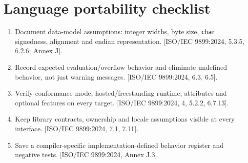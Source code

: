 \documentclass[10pt,letterpaper,oneside]{report}
\newcommand{\refcl}[1]{\textsf{\footnotesize[ISO/IEC 9899:2024, #1]}}
\begin{document}
\chapter{Language portability checklist}
\begin{enumerate}
\item Document data-model assumptions: integer widths, byte size, \texttt{char} signedness, alignment and endian representation. \refcl{5.3.5, 6.2.6; Annex J}.
\item Record expected evaluation/overflow behavior and eliminate undefined behavior, not just warning messages. \refcl{6.3, 6.5}.
\item Verify conformance mode, hosted/freestanding runtime, attributes and optional features on every target. \refcl{4, 5.2.2, 6.7.13}.
\item Keep library contracts, ownership and locale assumptions visible at every interface. \refcl{7.1, 7.11}.
\item Save a compiler-specific implementation-defined behavior register and negative tests. \refcl{Annex J.3}.
\end{enumerate}
\end{document}
